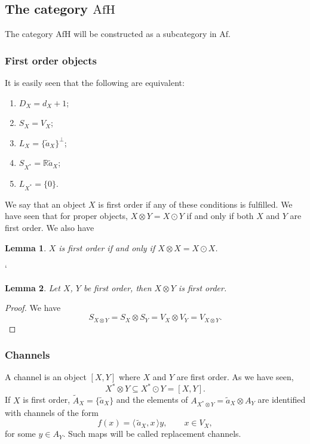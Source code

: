 \documentclass[12pt]{article}
\newtheorem{lemma}{Lemma}
\theoremstyle{definition}
\theoremstyle{remark}
\def\<{\langle\,}
\def\>{\,\rangle}
\def \Afh{\mathrm{AfH}}
\def \Af{\mathrm{Af}}
\begin{document}
\subsection{The category $\Afh$} 


The category $\Afh$ will be constructed as a subcategory in $\Af$. 

\subsubsection{First order objects}

It is easily seen that the following are equivalent:
\begin{enumerate}
\item $D_X=d_X+1$;
\item $S_X=V_X$;
\item $L_X=\{\tilde a_X\}^\perp$;
\item $S_{X^*}=\mathbb R \tilde a_X$;
\item $L_{X^*}=\{0\}$.
\end{enumerate}
We say that an object $X$ is first order if any of these conditions is fulfilled. We have
seen that for proper objects, $X\otimes Y=X\odot Y$ if and only if both $X$ and $Y$ are
first order. We also have

\begin{lemma}\label{lemma:firstorder} $X$ is first order if and only if  $X\otimes
X=X\odot X$.

\end{lemma}
`
\begin{lemma}\label{lemma:1ordertensor} Let $X$, $Y$ be first order, then $X\otimes Y$ is
first order.

\end{lemma}

\begin{proof} We have
\[
S_{X\otimes Y}=S_X\otimes S_Y=V_X\otimes V_Y=V_{X\otimes Y}.
\]

\end{proof}


\subsubsection{Channels}
A channel is an object $[X,Y]$ where  $X$ and $Y$ are first order. As we have seen,
\[
X^*\otimes Y\subseteq X^*\odot Y=[X,Y].
\]
If $X$ is first order, $\tilde A_X=\{\tilde a_X\}$ and the elements of $A_{X^*\otimes
Y}=\tilde a_X\otimes A_Y$ are identified with channels of the form
\[
f(x)=\<\tilde a_X,x\>y,\qquad x\in V_X,
\]
for some $y\in A_Y$. Such maps will be called replacement channels.
\end{document}
